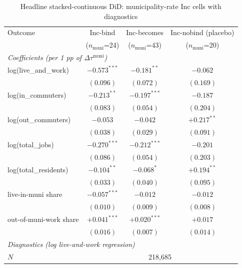 \documentclass[12pt]{article}
\begin{document}
\begin{table}[H]
    \centering
    \caption{Headline stacked-continuous DiD: municipality-rate Inc cells with diagnostics}
    \label{tab:headline}
    \small
    \begin{tabular}{lccc}
        \toprule
        Outcome & Inc-bind & Inc-becomes & Inc-nobind (placebo) \\
        & ($n_{\text{muni}}$=24) & ($n_{\text{muni}}$=43) & ($n_{\text{muni}}$=20) \\
        \midrule
        \multicolumn{4}{l}{\textit{Coefficients (per 1 pp of $\Delta\tau^{\text{muni}}$)}} \\
        log(live\_and\_work)    & $-0.573^{***}$ & $-0.181^{**}$  & $-0.062$ \\
                                 & $(0.096)$      & $(0.072)$      & $(0.169)$ \\
        log(in\_commuters)      & $-0.213^{**}$  & $-0.197^{***}$ & $-0.187$ \\
                                 & $(0.083)$      & $(0.054)$      & $(0.204)$ \\
        log(out\_commuters)     & $-0.053$       & $-0.042$       & $+0.217^{**}$ \\
                                 & $(0.038)$      & $(0.029)$      & $(0.091)$ \\
        log(total\_jobs)        & $-0.270^{***}$ & $-0.212^{***}$ & $-0.201$ \\
                                 & $(0.086)$      & $(0.054)$      & $(0.203)$ \\
        log(total\_residents)   & $-0.104^{**}$ & $-0.068^{*}$   & $+0.194^{**}$ \\
                                 & $(0.033)$      & $(0.040)$      & $(0.095)$ \\
        live-in-muni share         & $-0.057^{***}$ & $-0.012$       & $-0.012$ \\
                                 & $(0.010)$      & $(0.009)$      & $(0.008)$ \\
        out-of-muni-work share    & $+0.041^{***}$ & $+0.020^{***}$ & $+0.017$ \\
                                 & $(0.016)$      & $(0.007)$      & $(0.014)$ \\
        \midrule
        \multicolumn{4}{l}{\textit{Diagnostics (log live-and-work regression)}} \\
        $N$                                  & \multicolumn{3}{c}{218{,}685} \\

\end{tabular}
\end{table}
\end{document}
